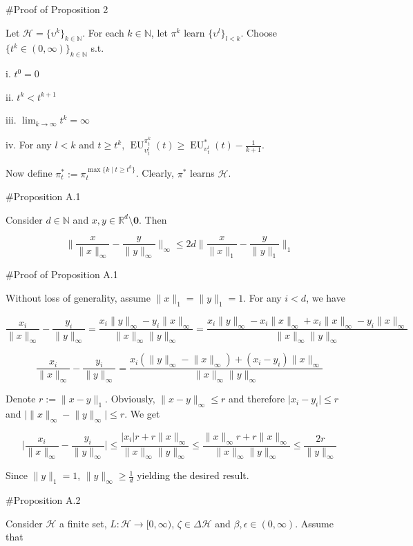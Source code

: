 \documentclass[a4paper]{article}
\newcommand{\Nats}{\mathbb{N}}
\newcommand{\Reals}{\mathbb{R}}
\newcommand{\Abs}[1]{\lvert #1 \rvert}
\newcommand{\Norm}[1]{\lVert #1 \rVert}
\newcommand{\Hy}{\mathcal{H}}
\newcommand{\EU}{\operatorname{EU}}
\begin{document}
\#Proof of Proposition 2

Let $\Hy = \{\upsilon^k\}_{k \in \Nats}$. For each $k \in \Nats$, let $\pi^k$ learn $\{\upsilon^l\}_{l < k}$. Choose $\{t^k \in (0,\infty)\}_{k \in \Nats}$ s.t.

i. $t^0 = 0$

ii. $t^k < t^{k+1}$

iii. $\lim_{k \rightarrow \infty} t^k = \infty$

iv. For any $l < k$ and $t \geq t^k$, $\EU_{\upsilon^l_t}^{\pi^k_t}(t) \geq \EU_{\upsilon^l_t}^*(t) - \frac{1}{k+1}$.

Now define $\pi^*_t:=\pi_t^{\max\{k \mid t \geq t^k\}}$. Clearly, $\pi^*$ learns $\Hy$.

\#Proposition A.1

Consider $d \in \Nats$ and $x,y \in \Reals^d \setminus \boldsymbol{0}$. Then

$$\Norm{\frac{x}{\Norm{x}_\infty}-\frac{y}{\Norm{y}_\infty}}_\infty \leq2d \Norm{\frac{x}{\Norm{x}_1}-\frac{y}{\Norm{y}_1}}_1$$

\#Proof of Proposition A.1

Without loss of generality, assume $\Norm{x}_1 = \Norm{y}_1 = 1$. For any $i < d$, we have

$$\frac{x_i}{\Norm{x}_\infty} - \frac{y_i}{\Norm{y}_\infty} = \frac{x_i\Norm{y}_\infty-y_i\Norm{x}_\infty}{\Norm{x}_\infty\Norm{y}_\infty} = \frac{x_i\Norm{y}_\infty - x_i\Norm{x}_\infty + x_i\Norm{x}_\infty - y_i\Norm{x}_\infty}{\Norm{x}_\infty\Norm{y}_\infty}$$

$$\frac{x_i}{\Norm{x}_\infty} - \frac{y_i}{\Norm{y}_\infty} = \frac{x_i(\Norm{y}_\infty - \Norm{x}_\infty) + (x_i - y_i)\Norm{x}_\infty}{\Norm{x}_\infty\Norm{y}_\infty}$$

Denote $r:=\Norm{x-y}_1$. Obviously, $\Norm{x-y}_\infty \leq r$ and therefore $\Abs{x_i-y_i} \leq r$ and $\Abs{\Norm{x}_\infty - \Norm{y}_\infty} \leq r$. We get

$$\Abs{\frac{x_i}{\Norm{x}_\infty} - \frac{y_i}{\Norm{y}_\infty}} \leq \frac{\Abs{x_i}r + r\Norm{x}_\infty}{\Norm{x}_\infty\Norm{y}_\infty} \leq \frac{\Norm{x}_\infty r + r\Norm{x}_\infty}{\Norm{x}_\infty\Norm{y}_\infty} \leq \frac{2r}{\Norm{y}_\infty}$$

Since $\Norm{y}_1 = 1$, $\Norm{y}_\infty \geq \frac{1}{d}$ yielding the desired result.

\#Proposition A.2

Consider $\Hy$ a finite set, $L: \Hy \rightarrow [0,\infty)$, $\zeta \in \Delta\Hy$ and $\beta,\epsilon \in (0,\infty)$. Assume that
\end{document}
